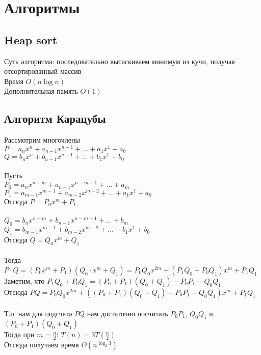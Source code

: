 \documentclass[12pt]{article}
\begin{document}
\section{Алгоритмы}
\subsection{Heap sort}
Суть алгоритма: последовательно вытаскиваем минимум из кучи, получая отсортированный массив\\
Время $O(n\log n)$\\
Дополнительная память $O(1)$
\subsection{Алгоритм Карацубы}
Рассмотрим многочлены\\
$P = a_nx^n+a_{n-1}x^{n-1}+\ldots+a_1x^1+a_0$\\
$Q = b_nx^n+b_{n-1}x^{n-1}+\ldots+b_1x^1+b_0$\\\\
Пусть\\
$P_0 = a_nx^{n-m}+a_{n-1}x^{n-m-1}+\ldots+a_m$\\
$P_1 = a_{m-1}x^{m-1}+a_{m-2}x^{m-2}+\ldots+a_1x^1+a_0$\\
Отсюда $P = P_0 x^m+P_1$\\\\
$Q_0 = b_nx^{n-m}+b_{n-1}x^{n-m-1}+\ldots+b_m$\\
$Q_1 = b_{m-1}x^{m-1}+b_{m-2}x^{m-2}+\ldots+b_1x^1+b_0$\\
Отсюда $Q = Q_0 x^m+Q_1$\\\\
Тогда\\
$P\cdot Q = (P_0 x^m+P_1)(Q_0\cdot x^m+Q_1) = P_0Q_0 x^{2m}+(P_1Q_0+P_0Q_1) x^m+P_1Q_1$\\
Заметим, что $P_1Q_0+P_0Q_1 = (P_0+P_1)(Q_0+Q_1) - P_0P_1 - Q_0Q_1$\\
Отсюда $PQ = P_0Q_0 x^{2m}+((P_0+P_1)(Q_0+Q_1) - P_0P_1 - Q_0Q_1) x^m+P_1Q_1$\\\\
Т.о. нам для подсчета $PQ$ нам достаточно посчитать $P_0P_1$, $Q_0Q_1$ и $(P_0+P_1)(Q_0+Q_1)$\\
Тогда при $m=\frac n2$: $T(n)=3T(\frac n2)$\\
Отсюда получаем время $O(n^{\log_2 3})$
\end{document}
